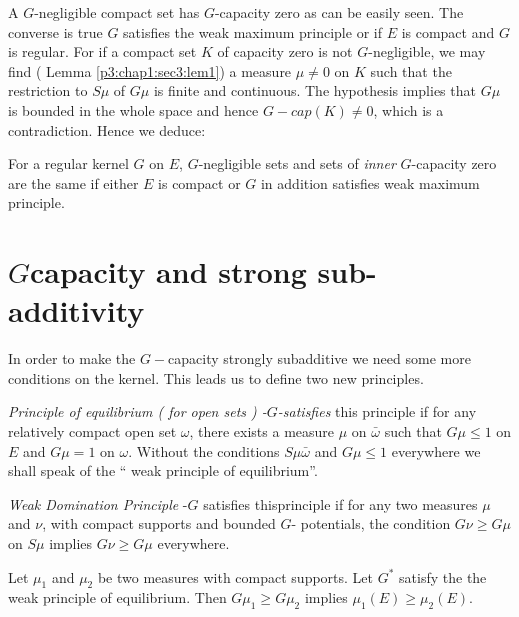 A $G$-negligible compact set has $G$-capacity zero as can be easily
seen. The converse is true $G$ satisfies the weak maximum principle or
if $E$ is compact and $G$ is regular. For if a compact set $K$ of
capacity zero is not $G$-negligible, we  may find ( Lemma
\ref{p3:chap1:sec3:lem1}) a measure
$ \mu \neq  0 $ on $K$ such that the  restriction to $ S \mu $ of $ G
\mu $ is finite and continuous. The hypothesis implies that $ G \mu $
is  bounded in the whole space and hence  $ G- cap (K) \neq 0 $, which
is a contradiction. Hence we deduce: 

\begin{prop}\label{p3:chap4:sec10:prop10}  %
  For a regular kernel $G$ on $E$, $G$-negligible sets and sets of {\em
    inner } $G$-capacity zero are the same if either $E$ is compact or
  $G$ in addition satisfies weak maximum principle. 
\end{prop}

\section{\texorpdfstring{$G$}-capacity and strong sub-additivity}\label{p3:chap4:sec11}

In order to make the  $G-$capacity strongly subadditive we need some
more conditions on the kernel. This leads us to define two new
principles. 

\begin{defn}\label{p3:chap4:sec11:def13} %
  {\em Principle of equilibrium ( for open sets ) -$G$-satisfies} this
  principle if for any relatively compact open set $ \omega $, there
  exists a measure $ \mu $ on $ \bar{\omega} $ such that $ G \mu \leq
  1 $ on $E$ and $ G \mu = 1 $ on $ \omega$. Without the conditions  $
  S \mu  \bar{\omega}$ and $ G \mu \leq 1 $ everywhere we shall speak
  of the `` weak principle of equilibrium''. 
\end{defn}

\begin{defn}\label{p3:chap4:sec11:def14} %
  {\em Weak Domination Principle} -$G$ satisfies this\pageoriginale principle if for
  any two measures $ \mu $ and $ \nu $, with compact supports and
  bounded  $G$- potentials, the condition $G \nu \geq  G \mu $ on $
  S \mu $ implies $ G \nu \geq G \mu $ everywhere. 
\end{defn}

\begin{prop}\label{p3:chap4:sec11:prop11} %
  Let $ \mu_1 $ and $ \mu_2 $ be two measures with compact
  supports. Let $G^*$ satisfy the the weak principle of
  equilibrium. Then $ G \mu_1 \geq G \mu_2 $ implies $ \mu_1 (E) \geq
  \mu_2 (E)$. 
\end{prop}

